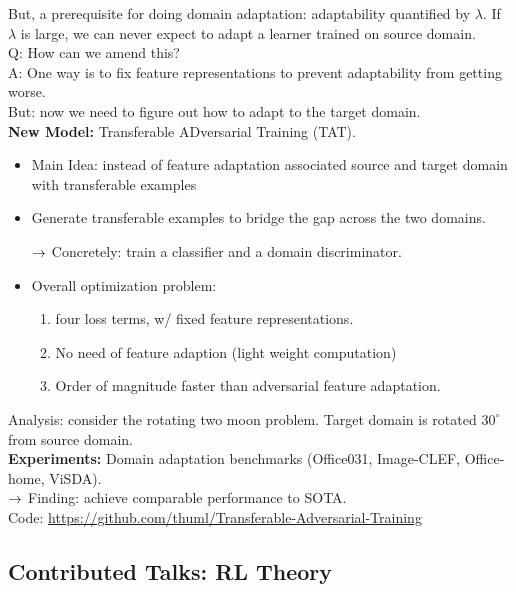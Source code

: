 But, a prerequisite for doing domain adaptation: adaptability quantified by $\lambda$. If $\lambda$ is large, we can never expect to adapt a learner trained on source domain. \\

Q: How can we amend this? \\

A: One way is to fix feature representations to prevent adaptability from getting worse. \\

But: now we need to figure out how to adapt to the target domain. \\

{\bf New Model:} Transferable ADversarial Training (TAT).
\begin{itemize}
    \item Main Idea: instead of feature adaptation associated source and target domain with transferable examples
    \item Generate transferable examples to bridge the gap across the two domains.
    
    $\rightarrow$ Concretely: train a classifier and a domain discriminator.
    \item Overall optimization problem: 
    \begin{enumerate}
        \item four loss terms, w/ fixed feature representations.
        \item  No need of feature adaption (light weight computation)
        \item Order of magnitude faster than adversarial feature adaptation.
    \end{enumerate} 
\end{itemize}

Analysis: consider the rotating two moon problem. Target domain is rotated $30^\circ$ from source domain. \\

{\bf Experiments:} Domain adaptation benchmarks (Office031, Image-CLEF, Office-home, ViSDA). \\

$\rightarrow$ Finding: achieve comparable performance to SOTA. \\

Code: \url{https://github.com/thuml/Transferable-Adversarial-Training}

\spacerule

\subsection{Contributed Talks: RL Theory}


